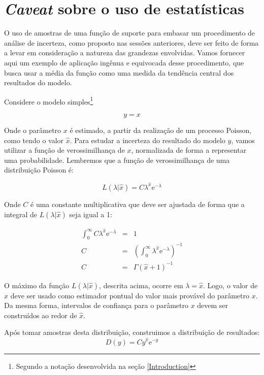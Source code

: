 \section{{\em Caveat} sobre o uso de estatísticas}

O uso de amostras de uma função de suporte para embasar um procedimento de análise de incerteza, como proposto
nas sessões anteriores, deve ser feito de forma a levar em consideração a natureza das grandezas envolvidas.
Vamos fornecer aqui um exemplo de aplicação ingênua e equivocada desse procedimento, que busca usar a média
da função como uma medida da tendência central dos resultados do modelo.

Considere o modelo simples\footnote{Segundo a notação desenvolvida na seção \ref{Introduction}}

\begin{equation}
	y = x
\end{equation}

Onde o par\^ametro $x$ \'e estimado, a partir da realiza\c c\~ao de um
processo Poisson, como tendo o valor $\hat x$. Para estudar a incerteza
do resultado do modelo $y$, vamos utilizar a fun\c c\~ao de verossimilhan\c ca
de $x$, normalizada de forma a representar uma probabilidade. Lembremos que
a fun\c c\~ao de verossimilhan\c ca de uma distribui\c c\~ao Poisson
\'e:

\begin{equation}
	L \left( \lambda | \hat x \right) = C \lambda^{\hat x} \mathrm{e}^{-\lambda}
\end{equation}

Onde $C$ \'e uma constante multiplicativa que deve ser ajustada de forma
que a integral de $L(\lambda | \hat x)$ seja igual a 1:

\begin {eqnarray*}
\int_0^\infty C \lambda^{\hat x} \mathrm{e}^{-\lambda} & = & 1 \\
C & = & \left( \int_0^\infty  \lambda^{\hat x} \mathrm{e}^{-\lambda} \right)^{-1} \\
C & = & \Gamma(\hat x +1)^{-1}
\end{eqnarray*}

O m\'aximo da fun\c c\~ao $L(\lambda | \hat x)$, descrita acima, ocorre em $\lambda = \hat x$.
Logo, o valor de $\hat x$ deve ser usado como estimador pontual do valor mais prov\'avel
do par\^ametro $x$. Da mesma forma, intervalos de confian\c ca para o par\^ametro $x$ devem
ser constru\'idos ao redor de $\hat x$.

Ap\'os tomar amostras desta distribui\c c\~ao, construimos a distribui\c c\~ao
de resultados:
\begin{equation}
	D(y) = C y^{\hat x} \mathrm{e}^{-y}
\end{equation}

